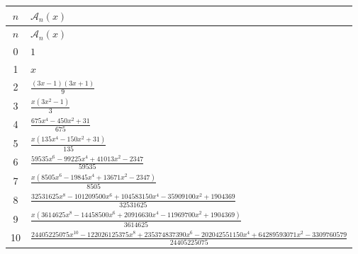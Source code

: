 \begingroup
\scriptsize
\begin{longtable}{@{}c p{}@{}}
\toprule
$n$ & $\mathcal A_n(x)$ \\
\midrule
\endfirsthead
\toprule
$n$ & $\mathcal A_n(x)$ \\
\midrule
\endhead
0 & $ 1 $  \\
1 & $ x $  \\
2 & $ \frac{\left(3 x - 1\right) \left(3 x + 1\right)}{9} $  \\
3 & $ \frac{x \left(3 x^{2} - 1\right)}{3} $  \\
4 & $ \frac{675 x^{4} - 450 x^{2} + 31}{675} $  \\
5 & $ \frac{x \left(135 x^{4} - 150 x^{2} + 31\right)}{135} $  \\
6 & $ \frac{59535 x^{6} - 99225 x^{4} + 41013 x^{2} - 2347}{59535} $  \\
7 & $ \frac{x \left(8505 x^{6} - 19845 x^{4} + 13671 x^{2} - 2347\right)}{8505} $  \\
8 & $ \frac{32531625 x^{8} - 101209500 x^{6} + 104583150 x^{4} - 35909100 x^{2} + 1904369}{32531625} $  \\
9 & $ \frac{x \left(3614625 x^{8} - 14458500 x^{6} + 20916630 x^{4} - 11969700 x^{2} + 1904369\right)}{3614625} $  \\
10 & $ \frac{24405225075 x^{10} - 122026125375 x^{8} + 235374837390 x^{6} - 202042551150 x^{4} + 64289593071 x^{2} - 3309760579}{24405225075} $  \\
\bottomrule
\end{longtable}
\endgroup
